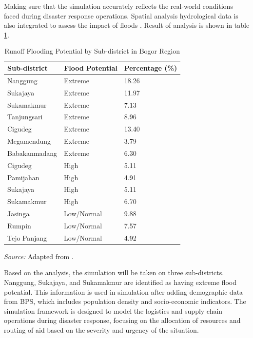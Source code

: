 \documentclass[journal,final,a4paper,twoside,11pt]{IEEEtran}
\begin{document}
Making sure that the simulation accurately reflects the real-world conditions faced during disaster response operations. Spatial analysis hydrological data is also integrated to assess the impact of floods \cite{alkaesi2021spatial}. Result of analysis is shown in table \ref{tab:analysis}.
\begin{table}[htbp]
\caption{Runoff Flooding Potential by Sub-district in Bogor Region}
\begin{center}
\begin{tabular}{|m{2.5cm}|m{2cm}|m{2cm}|}
\hline
\textbf{Sub-district} & \textbf{Flood Potential} & \textbf{Percentage (\%)} \\
\hline
Nanggung & Extreme & 18.26 \\
\hline Sukajaya & Extreme & 11.97 \\
\hline Sukamakmur & Extreme & 7.13 \\
\hline Tanjungsari & Extreme & 8.96 \\
\hline Cigudeg & Extreme & 13.40 \\
\hline Megamendung & Extreme & 3.79 \\
\hline Babakanmadang & Extreme & 6.30 \\
\hline
Cigudeg & High & 5.11 \\
\hline Pamijahan & High & 4.91 \\
\hline Sukajaya & High & 5.11 \\
\hline Sukamakmur & High & 6.70 \\
\hline
Jasinga & Low/Normal & 9.88 \\
\hline Rumpin & Low/Normal & 7.57 \\
\hline Tejo Panjang & Low/Normal & 4.92 \\
\hline
\end{tabular}
\vspace{0.2cm}

\footnotesize{\textit{Source:} Adapted from \cite{alkaesi2021spatial}.}
\label{tab:analysis}
\end{center}
\end{table}

Based on the analysis, the simulation will be taken on three sub-districts. Nanggung, Sukajaya, and Sukamakmur are identified as having extreme flood potential. This information is used in simulation after adding demographic data from BPS, which includes population density and socio-economic indicators. The simulation framework is designed to model the logistics and supply chain operations during disaster response, focusing on the allocation of resources and routing of aid based on the severity and urgency of the situation.
\end{document}
